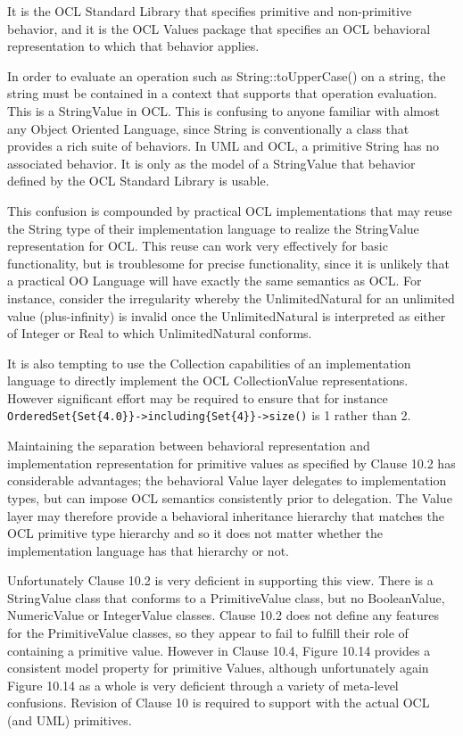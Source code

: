 \documentclass{eceasst}
\begin{document}
 It is the OCL Standard Library that specifies primitive and non-primitive behavior, and it is the OCL Values package that specifies an OCL behavioral representation to which that behavior applies. 

In order to evaluate an operation such as String::toUpperCase() on a string, the string must be contained in a context that supports that operation evaluation. This is a StringValue in OCL. This is confusing to anyone familiar with almost any Object Oriented Language, since String is conventionally a class that provides a rich suite of behaviors. In UML and OCL, a primitive String has no associated behavior. It  is only as the model of a StringValue that behavior defined by the OCL Standard Library is usable.

This confusion is compounded by practical OCL implementations that may reuse the String type of their implementation language to realize the StringValue representation for OCL. This reuse can work very effectively for basic functionality, but is troublesome for precise functionality, since it is unlikely that a practical OO Language will have exactly the same semantics as OCL. For instance, consider the irregularity whereby the UnlimitedNatural for an unlimited value (plus-infinity)  is invalid once the UnlimitedNatural is interpreted as either of Integer or Real to which UnlimitedNatural conforms.

It is also tempting to use the Collection capabilities of an implementation language to directly implement the OCL CollectionValue representations. However significant effort may be required to ensure that for instance \verb|OrderedSet{Set{4.0}}->including{Set{4}}->size()| is 1 rather than 2.

Maintaining the separation between behavioral representation and implementation representation for primitive values as specified by Clause 10.2 has considerable advantages; the behavioral Value layer delegates to implementation types, but can impose OCL semantics consistently prior to delegation. The Value layer may therefore provide a behavioral inheritance hierarchy that matches the OCL primitive type hierarchy and so it does not matter whether the implementation language has that hierarchy or not.

Unfortunately Clause 10.2 is very deficient in supporting this view. There is a StringValue class that conforms to a PrimitiveValue class, but no BooleanValue, NumericValue or IntegerValue classes. Clause 10.2  does not define any features for the PrimitiveValue classes, so they appear to fail to fulfill their role of containing a primitive value. However in Clause 10.4, Figure 10.14 provides a consistent model property for primitive Values, although unfortunately again Figure 10.14 as a whole is very deficient through a variety of meta-level confusions. Revision of Clause 10 is required to support with the actual OCL (and UML) primitives.
\end{document}
